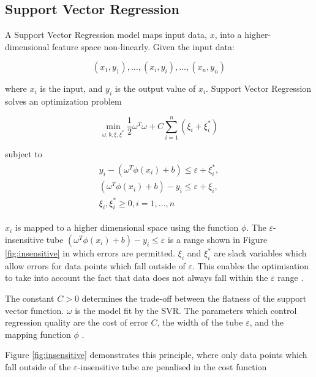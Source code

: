 \subsection{Support Vector Regression}

A Support Vector Regression model maps input data, $x$, into a higher-dimensional feature space non-linearly. Given the input data:

\begin{equation}
(x_1,y_1), \ldots,(x_i,y_i),\ldots,(x_n,y_n) 
\end{equation}

\noindent where $x_i$ is the input, and $y_i$ is the output value of $x_i$. Support Vector Regression solves an optimization problem \cite{Shu2006,Chen2004}

\begin{equation}
\min_{\omega,b,\xi,\xi^{*}}\frac{1}{2}\omega^T\omega+C\sum_{i=1}^{n}(\xi_i+\xi_i^*)
\end{equation}

\noindent subject to
\begin{align}
\begin{multlined}
\label{svr:constrains}
y_i-(\omega^T\phi(x_i)+b)\leq\varepsilon+\xi_i^{*},\\
(\omega^T\phi(x_i)+b)-y_i\leq\varepsilon+\xi_i,\\
\xi_i,\xi^*_i\geq0,i=1,\ldots,n
\end{multlined}
\end{align}


\noindent $x_i$ is mapped to a higher dimensional space using the function $\phi$. The $\varepsilon$-insensitive tube $(\omega^T\phi(x_i)+b)-y_i\leq\varepsilon$ is a range shown in Figure \ref{fig:insensitive} in which errors are permitted. $\xi_i$ and $\xi^*_i$ are slack variables which allow errors for data points which fall outside of $\varepsilon$. This enables the optimisation to take into account the fact that data does not always fall within the $\varepsilon$ range \cite{Smola2004}.

The constant $C>0$ determines the trade-off between the flatness of the support vector function. $\omega$ is the model fit by the SVR. The parameters which control regression quality are the cost of error $C$, the width of the tube $\varepsilon$, and the mapping function $\phi$ \cite{Shu2006,Chen2004}. 

Figure \ref{fig:insensitive} demonstrates this principle, where only data points which fall outside of the $\varepsilon$-insensitive tube are penalised in the cost function

